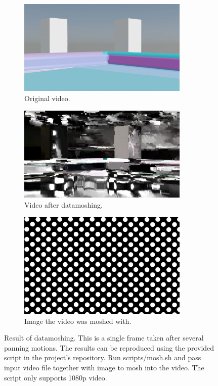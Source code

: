 \documentclass[11pt,english]{report}
\begin{document}
\begin{figure}[!ht]
	\centering
	\begin{subfigure}{230pt}
		\includegraphics[width=230pt]{docs/report/mosh-original.jpg}
		\caption{\centering Original video.}
	\end{subfigure}
	\begin{subfigure}{230pt}
		\includegraphics[width=230pt]{docs/report/moshed.jpg}
		\caption{\centering Video after datamoshing.}
	\end{subfigure}
	\begin{subfigure}{230pt}
		\includegraphics[width=230pt]{docs/report/mosh-to.jpg}
		\caption{\centering Image the video was moshed with.}
	\end{subfigure}
	\caption{\centering Result of datamoshing. This is a single frame taken after several panning motions. The results can be reproduced using the provided script in the project's repository. Run scripts/mosh.sh and pass input video file together with image to mosh into the video. The script only supports 1080p video.}
\end{figure}
\end{document}
